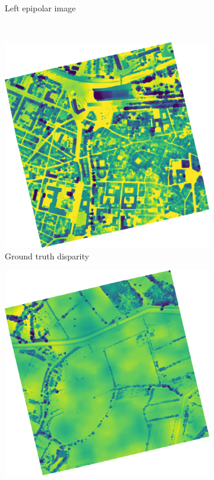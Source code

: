 \begin{figure}[ht!]
\begin{subfigure}[t]{0.4\linewidth}
        \caption{Left epipolar image}
        \label{fig:mtp_img_b}
    \end{subfigure}\\
    \begin{subfigure}[t]{0.4\linewidth}
        \centering
        \includegraphics[width=\linewidth]{Images/Chap_5/img_MTP_120_gt.png}
        \caption{Ground truth disparity}
        \label{fig:mtp_img_c}
    \end{subfigure}\hfill
    \begin{subfigure}[t]{0.4\linewidth}
        \centering
        \includegraphics[width=\linewidth]{Images/Chap_5/img_MTP_153_gt.png}

\end{subfigure}
\end{figure}
